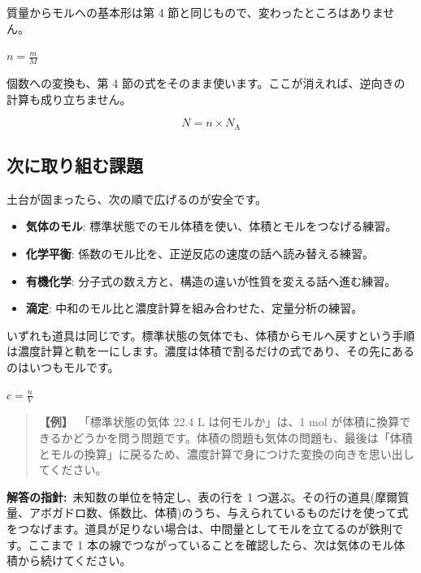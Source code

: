 \documentclass{article}
\begin{document}
質量からモルへの基本形は第 4 節と同じもので、変わったところはありません。

\( n = \frac{m}{M} \)

個数への変換も、第 4 節の式をそのまま使います。ここが消えれば、逆向きの計算も成り立ちません。

\[ N = n \times N_{\mathrm{A}} \]

\subsection{次に取り組む課題}

土台が固まったら、次の順で広げるのが安全です。

\begin{itemize}
\item \textbf{気体のモル}: 標準状態でのモル体積を使い、体積とモルをつなげる練習。
\item \textbf{化学平衡}: 係数のモル比を、正逆反応の速度の話へ読み替える練習。
\item \textbf{有機化学}: 分子式の数え方と、構造の違いが性質を変える話へ進む練習。
\item \textbf{滴定}: 中和のモル比と濃度計算を組み合わせた、定量分析の練習。
\end{itemize}

いずれも道具は同じです。標準状態の気体でも、体積からモルへ戻すという手順は濃度計算と軌を一にします。濃度は体積で割るだけの式であり、その先にあるのはいつもモルです。

\( c = \frac{n}{V} \)

\begin{quote}
\textbf{【例】}\ 「標準状態の気体 22.4 L は何モルか」は、1 mol が体積に換算できるかどうかを問う問題です。体積の問題も気体の問題も、最後は「体積とモルの換算」に戻るため、濃度計算で身につけた変換の向きを思い出してください。
\end{quote}

\textbf{解答の指針:}\ 未知数の単位を特定し、表の行を 1 つ選ぶ。その行の道具(摩爾質量、アボガドロ数、係数比、体積)のうち、与えられているものだけを使って式をつなげます。道具が足りない場合は、中間量としてモルを立てるのが鉄則です。ここまで 1 本の線でつながっていることを確認したら、次は気体のモル体積から続けてください。
\end{document}
